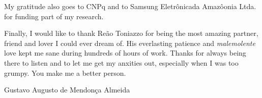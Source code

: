 \begin{acknowledgements}
\bigskip
My gratitude also goes to CNPq and to Samsung Eletr\^onicada Amaz\^oonia Ltda. for funding part of my research.

\bigskip
Finally, I would like to thank Re\~ao Toniazzo for being the most amazing partner, friend and lover I could ever dream of. His everlasting patience and \emph{malemolente} love kept me sane during hundreds of hours of work. Thanks for always being there to listen and to let me get my anxities out, especially when I was too grumpy. You make me a better person. 

\vfill
Gustavo Augusto de Mendon\c{c}a Almeida
\end{acknowledgements}

